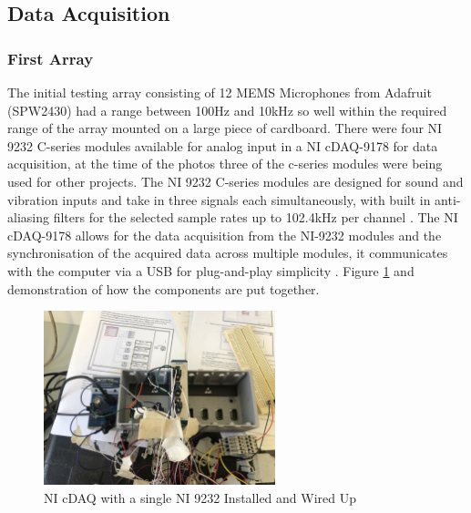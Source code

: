 \documentclass{UoNMCHA}
\numberwithin{equation}{section}
\begin{document}
\subsection{Data Acquisition} \label{sec:DAQ}

\subsubsection{First Array} \label{sec:First Design DAQ}
    The initial testing array consisting of 12 MEMS Microphones from Adafruit (SPW2430) had a range between 100Hz and 10kHz so well within the required range of the array \citep{Ada} mounted on a large piece of cardboard. There were four NI 9232 C-series modules available for analog input in a NI cDAQ-9178 for data acquisition, at the time of the photos three of the c-series modules were being used for other projects. The NI 9232 C-series modules are designed for sound and vibration inputs and take in three signals each simultaneously, with built in anti-aliasing filters for the selected sample rates up to 102.4kHz per channel \citep{NI9232}. The NI cDAQ-9178 allows for the data acquisition from the NI-9232 modules and the synchronisation of the acquired data across multiple modules, it communicates with the computer via a USB for plug-and-play simplicity \citep{cDAQ9178}. Figure \ref{fig:TestSetup} and demonstration of how the components are put together.

    \begin{figure} [H]
        \centering
        \includegraphics[keepaspectratio, width = 0.6\textwidth]{Figures/cDAQ.jpg}
        \caption{NI cDAQ with a single NI 9232 Installed and Wired Up}
        \label{fig:TestSetup}
    \end{figure}
\end{document}
